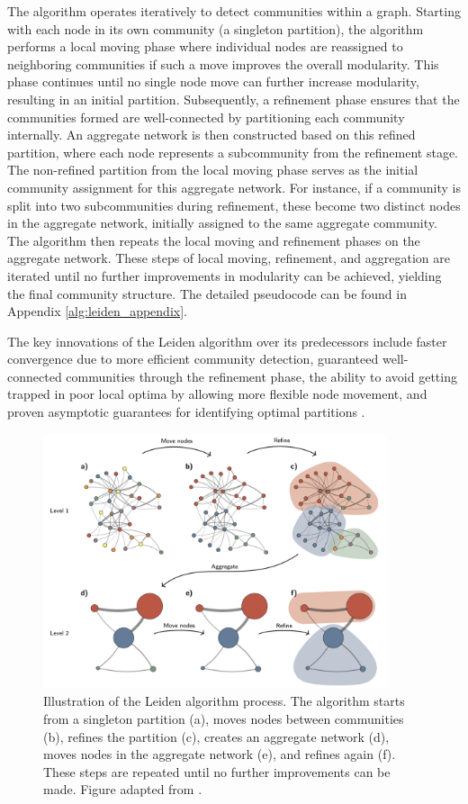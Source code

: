 The algorithm operates iteratively to detect communities within a graph. Starting with each node in its own community (a singleton partition), the algorithm performs a local moving phase where individual nodes are reassigned to neighboring communities if such a move improves the overall modularity. This phase continues until no single node move can further increase modularity, resulting in an initial partition. Subsequently, a refinement phase ensures that the communities formed are well-connected by partitioning each community internally. An aggregate network is then constructed based on this refined partition, where each node represents a subcommunity from the refinement stage. The non-refined partition from the local moving phase serves as the initial community assignment for this aggregate network. For instance, if a community is split into two subcommunities during refinement, these become two distinct nodes in the aggregate network, initially assigned to the same aggregate community. The algorithm then repeats the local moving and refinement phases on the aggregate network. These steps of local moving, refinement, and aggregation are iterated until no further improvements in modularity can be achieved, yielding the final community structure. The detailed pseudocode can be found in Appendix \ref{alg:leiden_appendix}.

The key innovations of the Leiden algorithm over its predecessors include faster convergence due to more efficient community detection, guaranteed well-connected communities through the refinement phase, the ability to avoid getting trapped in poor local optima by allowing more flexible node movement, and proven asymptotic guarantees for identifying optimal partitions \cite{leiden}.

\begin{figure}[h]
    \centering
    \includegraphics[width=0.9\textwidth]{img/Leiden_example.png}
    \caption{Illustration of the Leiden algorithm process. The algorithm starts from a singleton partition (a), moves nodes between communities (b), refines the partition (c), creates an aggregate network (d), moves nodes in the aggregate network (e), and refines again (f). These steps are repeated until no further improvements can be made. Figure adapted from \cite{leiden}.}
    \label{fig:leiden_algorithm}
\end{figure}

